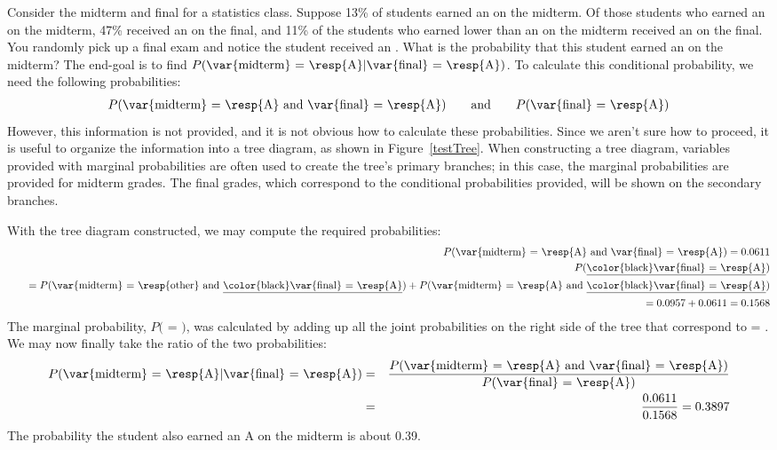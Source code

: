\begin{examplewrap}
\begin{nexample}{Consider the midterm and final for a statistics class. Suppose 13\% of students earned an  on the midterm. Of those students who earned an  on the midterm, 47\% received an  on the final, and 11\% of the students who earned lower than an  on the midterm received an  on the final. You randomly pick up a final exam and notice the student received an . What is the probability that this student earned an  on the midterm?} \label{exerciseForTreeDiagramOfStudentGettingAOnMidtermGivenThatSheGotAOnFinal}
The end-goal is to find $P(\text{\var{midterm} = \resp{A}} | \text{\var{final} = \resp{A}})$. To calculate this conditional probability, we need the following probabilities:
\begin{eqnarray*}
P(\text{\var{midterm} = \resp{A} and \var{final} = \resp{A}}) \qquad\text{and}\qquad
P(\text{\var{final} = \resp{A}})
\end{eqnarray*}
However, this information is not provided, and it is not obvious how to calculate these probabilities. Since we aren't sure how to proceed, it is useful to organize the information into a tree diagram, as shown in Figure~\ref{testTree}. When constructing a tree diagram, variables provided with marginal probabilities are often used to create the tree's primary branches; in this case, the marginal probabilities are provided for midterm grades. The final grades, which correspond to the conditional probabilities provided, will be shown on the secondary branches.

With the tree diagram constructed, we may compute the required probabilities:
\begin{eqnarray*}
&&P(\text{\var{midterm} = \resp{A} and \var{final} = \resp{A}}) = 0.0611 \\
&&P(\text{\underline{\color{black}\var{final} = \resp{A}}})  \\
&& \quad= P(\text{\var{midterm} = \resp{other} and \underline{\color{black}\var{final} = \resp{A}}}) + P(\text{\var{midterm} = \resp{A} and \underline{\color{black}\var{final} = \resp{A}}}) \\
&& \quad= 0.0957 + 0.0611  = 0.1568
\end{eqnarray*}
The marginal probability, $P($ = $)$, was calculated by adding up all the joint probabilities on the right side of the tree that correspond to  = . We may now finally take the ratio of the two probabilities:
\begin{eqnarray*}
P(\text{\var{midterm} = \resp{A}} | \text{\var{final} = \resp{A}}) &=& \frac{P(\text{\var{midterm} = \resp{A} and \var{final} = \resp{A}})}{P(\text{\var{final} = \resp{A}})} \\
&=& \frac{0.0611}{0.1568} = 0.3897
\end{eqnarray*}
The probability the student also earned an A on the midterm is about 0.39.
\end{nexample}
\end{examplewrap}

